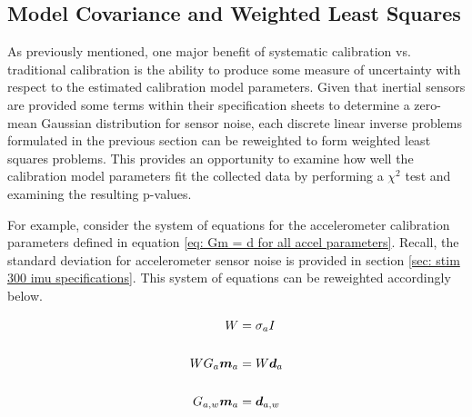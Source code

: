 \subsection{Model Covariance and Weighted Least Squares}

As previously mentioned, one major benefit of systematic calibration vs. traditional calibration is the ability to produce some measure of uncertainty with respect to the estimated calibration model parameters. Given that inertial sensors are provided some terms within their specification sheets to determine a zero-mean Gaussian distribution for sensor noise, each discrete linear inverse problems formulated in the previous section can be reweighted to form weighted least squares problems. This provides an opportunity to examine how well the calibration model parameters fit the collected data by performing a $\chi^2$ test and examining the resulting p-values.

For example, consider the system of equations for the accelerometer calibration parameters defined in equation \ref{eq: Gm = d for all accel parameters}. Recall, the standard deviation for accelerometer sensor noise is provided in section \ref{sec: stim 300 imu specifications}. This system of equations can be reweighted accordingly below.

\begin{align}
	W &= \sigma_a I \notag \notag\\
	\notag\\
	W G_a \boldsymbol{m}_a &= W \boldsymbol{d}_a \\
	\notag\\
	G_{a,w} \boldsymbol{m}_a &= \boldsymbol{d}_{a,w} \notag
\end{align}





